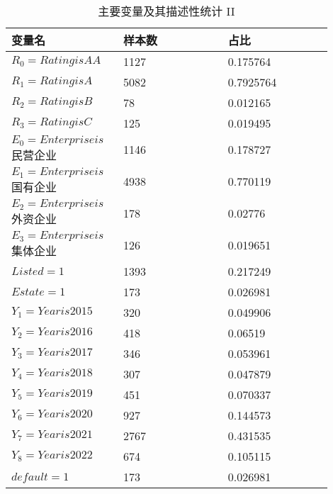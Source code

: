 \begin{table}[ht]
	\caption{主要变量及其描述性统计 II }
	\label{virtual}
	\begin{tabular}{p{0.3\linewidth}p{0.3\linewidth}p{0.3\linewidth}}
		\textbf{变量名}        & \textbf{样本数} & \textbf{占比} \\\hline
		\(R_0=Rating is AA\)       & 1127         & 0.175764    \\
		\(R_1=Rating is A\)        & 5082         & 0.7925764   \\
		\(R_2=Rating is B\)        & 78           & 0.012165    \\
		\(R_3=Rating is C\)        & 125          & 0.019495    \\
		\(E_0=Enterprise is\)民营企业 & 1146         & 0.178727    \\
		\(E_1=Enterprise is\)国有企业 & 4938         & 0.770119    \\
		\(E_2=Enterprise is\)外资企业 & 178          & 0.02776     \\
		\(E_3=Enterprise is\)集体企业 & 126          & 0.019651    \\
		\(Listed=1\)        & 1393         & 0.217249    \\
		\(Estate=1\)        & 173          & 0.026981    \\
		\(Y_1=Year is 2015\)       & 320          & 0.049906    \\
		\(Y_2=Year is 2016\)       & 418          & 0.06519     \\
		\(Y_3=Year is 2017\)       & 346          & 0.053961    \\
		\(Y_4=Year is 2018\)       & 307          & 0.047879    \\
		\(Y_5=Year is 2019\)       & 451          & 0.070337    \\
		\(Y_6=Year is 2020\)       & 927          & 0.144573    \\
		\(Y_7=Year is 2021\)       & 2767         & 0.431535    \\
		\(Y_8=Year is 2022\)       & 674          & 0.105115    \\
		\(default=1\)       & 173          & 0.026981    \\
	\end{tabular}\\
\end{table}

